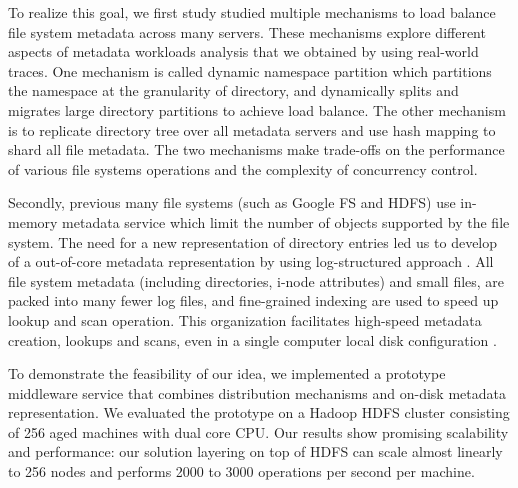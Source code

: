 To realize this goal, we first study studied multiple mechanisms to
load balance file system metadata across many servers.
These mechanisms explore different aspects of metadata workloads analysis
that we obtained by using real-world traces.
One mechanism is called dynamic namespace partition
which partitions the namespace at the granularity of directory,
and dynamically splits and migrates large directory partitions
to achieve load balance.
The other mechanism is to replicate directory tree over all
metadata servers and use hash mapping to shard all file metadata.
The two mechanisms make trade-offs on the performance of
various file systems operations and the complexity of concurrency
control.

Secondly, previous many file systems (such as Google FS
and HDFS) use in-memory metadata service which limit the number
of objects supported by the file system.
The need for a new representation of directory entries led us to develop
of a out-of-core metadata representation by using
log-structured approach \cite{ONeil1996, LFS}.
All file system metadata (including directories, i-node attributes) and small files,
are packed into many fewer log files,
and fine-grained indexing are used to speed up lookup and scan operation.
This organization facilitates high-speed metadata creation, lookups and scans,
even in a single computer local disk configuration \cite{TableFS}.

To demonstrate the feasibility of our idea,
we implemented a prototype middleware service that
combines distribution mechanisms and on-disk metadata representation.
We evaluated the prototype on a Hadoop HDFS cluster \cite{HDFS} consisting of 256 
aged machines with dual core CPU.
Our results show promising scalability and performance:
our solution layering on top of HDFS can scale almost linearly
to 256 nodes and performs 2000 to 3000 operations per second
per machine.

